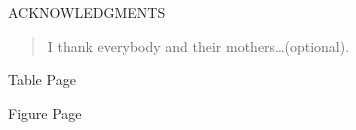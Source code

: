 \documentclass[12pt,oneside]{sfsuthesis}
\theoremstyle{plain} %
\theoremstyle{definition}  %
\theoremstyle{remark}  %
\begin{document}
\newpage
\[ \]
\vspace{-1.8in}
\begin{center}{ACKNOWLEDGMENTS}\end{center}

\vspace{.3in}
\begin{quote}
\noindent
I thank everybody and their mothers\dots (optional).
\end{quote}

\renewcommand{\contentsname}{\vspace{-1.8in} \begin{center} \normalsize \rm TABLE OF CONTENTS \end{center}}
\renewcommand{\listfigurename}{\vspace{-1.8in} \begin{center} \normalsize \rm LIST OF FIGURES \end{center}}
\renewcommand{\listtablename}{\vspace{-1.8in} \begin{center} \normalsize \rm LIST OF TABLES \end{center}}
\renewcommand{\cftchapfont}{\normalfont}
\renewcommand{\cftchappagefont}{\normalfont}
\renewcommand{\cftchapleader}{\cftdotfill{\cftdotsep}} %
\renewcommand{\cftsecfont}{\normalfont}
\renewcommand{\cftsecpagefont}{\normalfont}
\renewcommand{\cftsecleader}{\cftdotfill{\cftdotsep}}

\newpage \tableofcontents 
\newpage Table \hfill Page \listoftables %
\newpage Figure \hfill Page \listoffigures %

\newpage
\pagestyle{myheadings}
\setcounter{page}{1}
\end{document}
